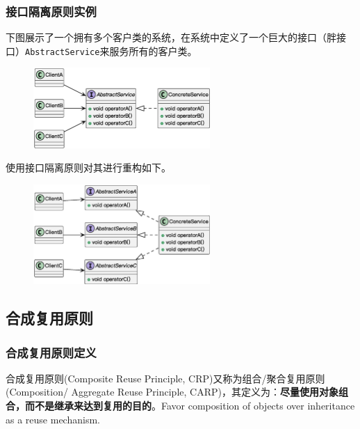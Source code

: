 \subsubsection{接口隔离原则实例}
下图展示了一个拥有多个客户类的系统，在系统中定义了一个巨大的接口（胖接口）\verb|AbstractService|\;来服务所有的客户类。
\begin{figure}[H]
    \vspace{-0.5em}
	\centering
	\includegraphics[width=0.6\textwidth]{images/接口隔离原则实例1.eps}
    \vspace{-1em}
\end{figure}

使用接口隔离原则对其进行重构如下。
\begin{figure}[H]
    \vspace{-0.5em}
	\centering
	\includegraphics[width=0.6\textwidth]{images/接口隔离原则实例2.eps}
    \vspace{-1em}
\end{figure}

\subsection{合成复用原则}

\subsubsection{合成复用原则定义}
合成复用原则(Composite Reuse Principle, CRP)又称为组合/聚合复用原则(Composition/ Aggregate Reuse Principle, CARP)，其定义为：\textbf{尽量使用对象组合，而不是继承来达到复用的目的}。Favor composition of objects over inheritance as a reuse mechanism.

